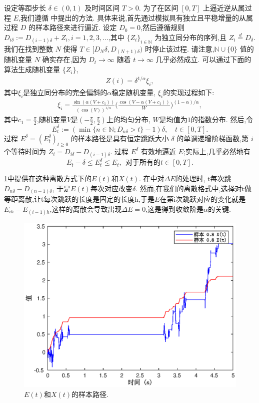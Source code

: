 \documentclass[12pt,final]{article}
\numberwithin{equation}{section}
\numberwithin{figure}{section}
\numberwithin{table}{section}
\theoremstyle{plain}
\theoremstyle{Definition}
\theoremstyle{Remark}
\begin{document}
	设定等距步长 $\delta \in (0,1)$ 及时间区间 $T > 0$. 为了在区间 $[0,T]$ 上逼近逆从属过程 $E$,我们遵循 \cite{magdziarz2009stochastic} 中提出的方法. 具体来说,首先通过模拟具有独立且平稳增量的从属过程 $D$ 的样本路径来进行逼近. 设定 $D_0 = 0$,然后遵循规则 $D_{i\delta} := D_{(i-1)\delta} + Z_i,i=1,2,3,\ldots$,其中 $\{Z_i\}_{i \in \mathbb{N}}$ 为独立同分布的序列,且 $Z_i \stackrel{d}{=} D_{\delta}$. 我们在找到整数 $N$ 使得 $T \in [D_N\delta,D_{(N+1)\delta})$ 时停止该过程. 请注意,$\mathbb{N}\cup\{0\}$ 值的随机变量 $N$ 确实存在,因为 $D_t \to \infty$ 随着 $t \to \infty$ 几乎必然成立. 可以通过下面的算法生成随机变量 $\{Z_i\}$,
	\begin{align*}
		Z(i)=\delta^{1/\alpha}\xi_{i},
	\end{align*}
	其中$\xi_i$是独立同分布的完全偏斜的$\alpha$稳定随机变量, $\xi_i$的实现过程如下:
	\begin{align*}
		\xi_i=\frac{\sin(\alpha(V+c_1))}{\left(\cos(V)\right)^{1/\alpha}}\Big(\frac{\cos(V-\alpha(V+c_1))}{W}\Big)^{(1-\alpha)/\alpha},
	\end{align*}
	其中$c_1 = \frac{\pi}{2}$,随机变量$V$是$(-\frac{\pi}{2},\frac{\pi}{2})$上的均匀分布, $W$是均值为$1$的指数分布. 
	然后,令
	$$
	E_t^\delta := \left(\min\{n \in \mathbb{N}; D_{n\delta} > t\} - 1\right)\delta,\quad t \in [0,T]. 
	$$
	过程 $E^\delta = (E_t^\delta)_{t \geq 0}$ 的样本路径是具有恒定跳跃大小 $\delta$ 的单调递增阶梯函数,第 $i$ 个等待时间为 $Z_i = D_{i\delta} - D_{(i-1)\delta}$. 过程 $E^\delta$ 有效地逼近 $E$;实际上,几乎必然地有
	$$
	E_t - \delta \leq E_t^\delta \leq E_t ,~~\text{对于所有} 的 t \in [0,T]. 
	$$
	
	\cref{fig1}中提供在这种离散方式下的$E(t)$和$X(t)$. 在\cite{jin2019strong}中对$\Delta E$的处理时, t每次跳$D_{n\delta} - D_{(n-1)\delta}$, 于是$E(t)$每次对应改变$\delta$. 然而,在我们的离散格式中,选择对t做等距离散,让t每次跳跃的长度是固定的长度h,于是$E$在第i次跳跃对应的变化就是$E_{ih} - E_{(i-1)h}$,这样的离散会导致出现$\Delta E=0$,这是得到收敛阶是$\alpha$的关键. 
	\begin{figure}[htp!]
		\centering
		\includegraphics[width=0.6\linewidth]{EandX.eps}
		\caption{$E(t)$和$X(t)$的样本路径.}
		\label{fig1}
		\vspace{-2ex}
		{}
	\end{figure}
	
\end{document}
